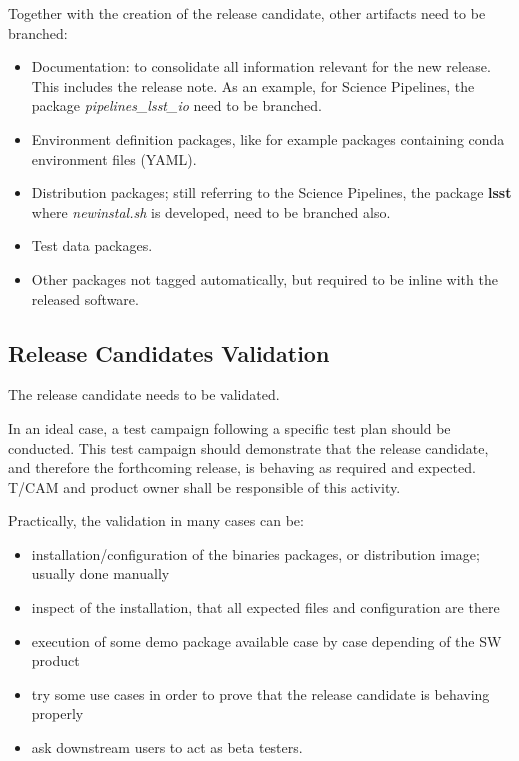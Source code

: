 Together with the creation of the release candidate, other artifacts need to be branched:

\begin{itemize}
\item Documentation: to consolidate all information relevant for the new release. This includes the release note.
As an example, for Science Pipelines, the package \textit{pipelines\_lsst\_io} need to be branched.
\item  Environment definition packages, like for example packages containing conda environment files (YAML).
\item  Distribution packages; still referring to the Science Pipelines, the package \textbf{lsst}  where \textit{newinstal.sh} is developed, need to be branched also.
\item Test data packages.
\item Other packages not tagged automatically, but required to be inline with the released software.
\end{itemize}


\subsection{Release Candidates Validation} \label{sec:rcvalidation}

The release candidate needs to be validated.

In an ideal case, a test campaign following a specific test plan should be conducted.
This test campaign should demonstrate that the release candidate, and therefore the forthcoming release, is behaving as required and expected.
T/CAM and product owner shall be responsible of this activity.

Practically, the validation in many cases can be:

\begin{itemize}
\item installation/configuration of the binaries packages, or distribution image; usually done manually
\item inspect of the installation, that all expected files and configuration are there
\item execution of some demo package available case by case depending of the SW product
\item try some use cases in order to prove that the release candidate is behaving properly
\item ask downstream users to act as beta testers.
\end{itemize}

